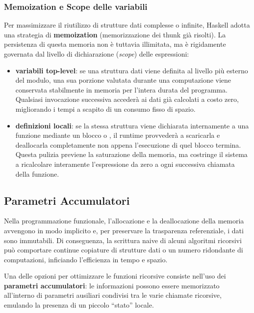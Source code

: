 \subsubsection{Memoization e Scope delle variabili}
Per massimizzare il riutilizzo di strutture dati complesse o infinite, Haskell adotta una strategia di \textbf{memoization} (memorizzazione dei thunk già risolti). La persistenza di questa memoria non è tuttavia illimitata, ma è rigidamente governata dal livello di dichiarazione (\textit{scope}) delle espressioni:
\begin{itemize}
    \item \textbf{variabili top-level}: se una struttura dati viene definita al livello più esterno del modulo, una sua porzione valutata durante una computazione viene conservata stabilmente in memoria per l'intera durata del programma. Qualsiasi invocazione successiva accederà ai dati già calcolati a costo zero, migliorando i tempi a scapito di un consumo fisso di spazio.
    \item \textbf{definizioni locali}: se la stessa struttura viene dichiarata internamente a una funzione mediante un blocco  o , il runtime provvederà a scaricarla e deallocarla completamente non appena l'esecuzione di quel blocco termina. Questa pulizia previene la saturazione della memoria, ma costringe il sistema a ricalcolare interamente l'espressione da zero a ogni successiva chiamata della funzione.
\end{itemize}

\subsection{Parametri Accumulatori}
Nella programmazione funzionale, l'allocazione e la deallocazione della memoria avvengono in modo implicito e, per preservare la trasparenza referenziale, i dati sono immutabili. Di conseguenza, la scrittura naive di alcuni algoritmi ricorsivi può comportare continue copiature di strutture dati o un numero ridondante di computazioni, inficiando l'efficienza in tempo e spazio.

Una delle opzioni per ottimizzare le funzioni ricorsive consiste nell'uso dei \textbf{parametri accumulatori}: le informazioni possono essere memorizzato all'interno di parametri ausiliari condivisi tra le varie chiamate ricorsive, emulando la presenza di un piccolo ``stato'' locale.


